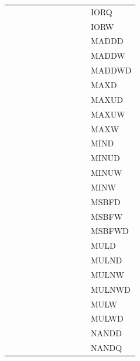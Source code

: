 {\begin{tabular}{|l|l|l|l|l|l|l|l|l|l|l|}
 & & & & & & & & & & \textsf{IORQ} \\
 & & & & & & & & & & \textsf{IORW} \\
 & & & & & & & & & & \textsf{MADDD} \\
 & & & & & & & & & & \textsf{MADDW} \\
 & & & & & & & & & & \textsf{MADDWD} \\
 & & & & & & & & & & \textsf{MAXD} \\
 & & & & & & & & & & \textsf{MAXUD} \\
 & & & & & & & & & & \textsf{MAXUW} \\
 & & & & & & & & & & \textsf{MAXW} \\
 & & & & & & & & & & \textsf{MIND} \\
 & & & & & & & & & & \textsf{MINUD} \\
 & & & & & & & & & & \textsf{MINUW} \\
 & & & & & & & & & & \textsf{MINW} \\
 & & & & & & & & & & \textsf{MSBFD} \\
 & & & & & & & & & & \textsf{MSBFW} \\
 & & & & & & & & & & \textsf{MSBFWD} \\
 & & & & & & & & & & \textsf{MULD} \\
 & & & & & & & & & & \textsf{MULND} \\
 & & & & & & & & & & \textsf{MULNW} \\
 & & & & & & & & & & \textsf{MULNWD} \\
 & & & & & & & & & & \textsf{MULW} \\
 & & & & & & & & & & \textsf{MULWD} \\
 & & & & & & & & & & \textsf{NANDD} \\
 & & & & & & & & & & \textsf{NANDQ} \\
\hline\end{tabular}
}
\smallskip

